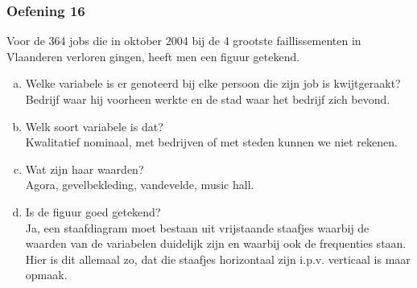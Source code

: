 \documentclass[13pt]{beamer}
\newenvironment{answer}
{\color{blue}}
{\color{black}}
\begin{document}
\begin{frame}
  \frametitle{Oefening 16}
  \begin{minipage}{0.65\linewidth}
    Voor de 364 jobs die in oktober 2004 bij de 4 grootste faillissementen in Vlaanderen verloren gingen, heeft men een figuur getekend.
  \end{minipage}
  \begin{enumerate}[(a)]
  \item Welke variabele is er genoteerd bij elke persoon die zijn job is kwijtgeraakt?\\
    \begin{answer}
      Bedrijf waar hij voorheen werkte en de stad waar het bedrijf zich bevond.
    \end{answer}
  \item Welk soort variabele is dat?\\
    \begin{answer}
      Kwalitatief nominaal, met bedrijven of met steden kunnen we niet rekenen.
    \end{answer}
  \item Wat zijn haar waarden?\\
    \begin{answer}
      Agora, gevelbekleding, vandevelde, music hall.
    \end{answer}
  \item Is de figuur goed getekend?\\
    \begin{answer}
      Ja, een staafdiagram moet bestaan uit vrijstaande staafjes waarbij de waarden van de variabelen duidelijk zijn en waarbij ook de frequenties staan. Hier is dit allemaal zo, dat die staafjes horizontaal zijn i.p.v. verticaal is maar opmaak.
    \end{answer}
  \end{enumerate}
\end{frame}
\end{document}
